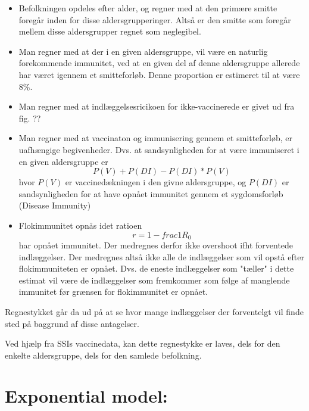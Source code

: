 \documentclass{article}
\begin{document}
\begin{itemize}
\item Befolkningen opdeles efter alder, og regner med at den primære smitte foregår inden for disse aldersgrupperinger. 
Altså er den smitte som foregår mellem disse aldersgrupper regnet som neglegibel. 

\item Man regner med at der i en given aldersgruppe, vil være en naturlig forekommende immunitet, ved at en given del af denne aldersgruppe allerede har været igennem et smitteforløb. 
Denne proportion er estimeret til at være 8\%.

\item Man regner med at indlæggelsesricikoen for ikke-vaccinerede er givet ud fra fig. ?? 

\item Man regner med at vaccinaton og immunisering gennem et smitteforløb, er uafhængige begivenheder. 
Dvs. at sandsynligheden for at være immuniseret i en given aldersgruppe er 
$$P(V) + P(DI) - P(DI)*P(V)$$
hvor $P(V)$ er vaccinedækningen i den givne aldersgruppe, og $P(DI)$ er sandsynligheden for at have opnået immunitet gennem et sygdomsforløb (Disease Immunity)

\item Flokimmunitet opnås idet ratioen 
$$r = 1 - frac{1}{R_{0}}$$ 
har opnået immunitet. 
Der medregnes derfor ikke overshoot ifht forventede indlæggelser.
Der medregnes altså ikke alle de indlæggelser som vil opstå efter flokimmuniteten er opnået. 
Dvs. de eneste indlæggelser som "tæller" i dette estimat vil være de indlæggelser som fremkommer som følge af manglende immunitet før grænsen for flokimmunitet er opnået.
\end{itemize}

Regnestykket går da ud på at se hvor mange indlæggelser der forventelgt vil finde sted på baggrund af disse antagelser.

Ved hjælp fra SSIs vaccinedata, kan dette regnestykke er laves, dels for den enkelte aldersgruppe, dels for den samlede befolkning.

\section*{Exponential model:}
\end{document}
